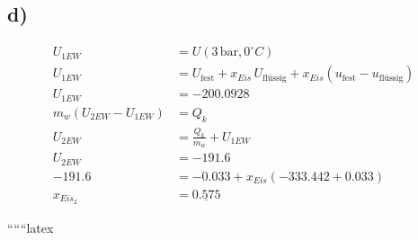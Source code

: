 \subsection*{d)}
\begin{align*}
    U_{1EW} &= U (3 \, \text{bar}, 0^\circ C) \\
    U_{1EW} &= U_{\text{fest}} + x_{Eis} \, U_{\text{flüssig}} + x_{Eis} (u_{\text{fest}} - u_{\text{flüssig}}) \\
    U_{1EW} &= -200.0928 \\
    m_w (U_{2EW} - U_{1EW}) &= Q_k \\
    U_{2EW} &= \frac{Q_k}{m_w} + U_{1EW} \\
    U_{2EW} &= -191.6 \\
    -191.6 &= -0.033 + x_{Eis} ( -333.442 + 0.033) \\
    x_{Eis_2} &= \underline{0.575}
\end{align*}

``````latex


